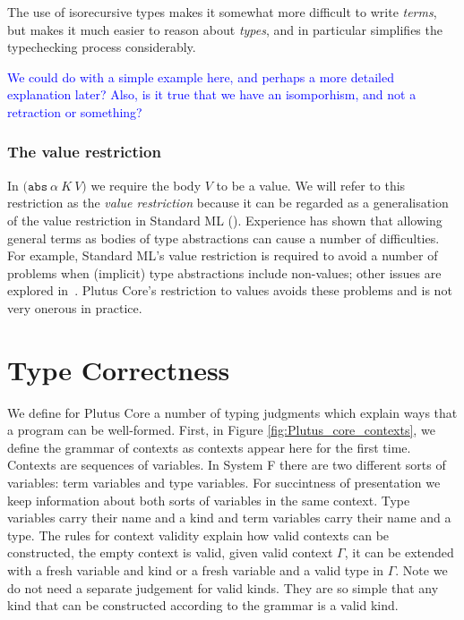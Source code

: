 \documentclass[a4paper]{article}
\newcommand{\blue}[1]{\textcolor{blue}{#1}}
\newcommand{\keyword}[1]{\texttt{#1}}
\newcommand{\construct}[1]{\texttt{(} #1 \texttt{)}}
\newcommand{\abs}[3]{\construct{\keyword{abs} ~ #1 ~ #2 ~ #3}}
\begin{document}
\noindent The use of isorecursive types makes it somewhat more difficult to
write \textit{terms}, but makes it much easier to reason about
\textit{types}, and in particular simplifies the typechecking process
considerably.

\noindent\blue{We could do with a simple example here, and perhaps a more detailed explanation
  later?  Also, is it true that we have an isomporhism, and not a retraction or something?}


\subsubsection{The value restriction}
In $\abs{\alpha}{K}{V}$ we require the body $V$ to be a value. We will
refer to this restriction as the \textit{value restriction} because it
can be regarded as a generalisation of the value restriction in
Standard ML (\cite[22.7]{Pierce:TAPL}). Experience has shown that
allowing general terms as bodies of type abstractions can cause a
number of difficulties.  For example, Standard ML's value restriction
is required to avoid a number of problems when (implicit) type
abstractions include non-values; other issues are explored
in~\cite[2.4]{Ahmed:2017}. Plutus Core's restriction to values avoids
these problems and is not very onerous in practice.
  


\section{Type Correctness}

We define for Plutus Core a number of typing judgments which explain
ways that a program can be well-formed. First, in Figure
\ref{fig:Plutus_core_contexts}, we define the grammar of contexts as
contexts appear here for the first time. Contexts are sequences of
variables. In System F there are two different sorts of variables:
term variables and type variables. For succintness of presentation we
keep information about both sorts of variables in the same
context. Type variables carry their name and a kind and term variables
carry their name and a type. The rules for context validity explain
how valid contexts can be constructed, the empty context is valid,
given valid context $\Gamma$, it can be extended with a fresh variable
and kind or a fresh variable and a valid type in $\Gamma$. Note we do
not need a separate judgement for valid kinds. They are so simple that
any kind that can be constructed according to the grammar is a valid
kind.
\end{document}
